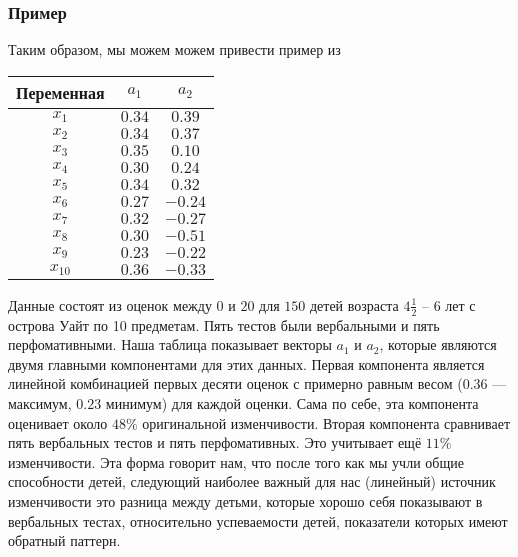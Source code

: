 \subsubsection*{Пример}
Таким образом, мы можем можем привести пример из \cite{pca}

\begin{center}
\begin{tabular}{ |c|c|c| } 
 \hline
 Переменная & $a_1$ & $a_2$ \\ 
 \hline \hline
 $x_1$ & $0.34$ & $0.39$ \\ 
 \hline
 $x_2$ & $0.34$ & $0.37$ \\ 
 \hline
 $x_3$ & $0.35$ & $0.10$ \\ 
 \hline
 $x_4$ & $0.30$ & $0.24$ \\ 
 \hline
 $x_5$ & $0.34$ & $0.32$ \\ 
 \hline
 $x_6$ & $0.27$ & $-0.24$ \\ 
 \hline
 $x_7$ & $0.32$ & $-0.27$ \\ 
 \hline
 $x_8$ & $0.30$ & $-0.51$ \\ 
 \hline
 $x_9$ & $0.23$ & $-0.22$ \\ 
 \hline
 $x_10$ & $0.36$ & $-0.33$ \\ 
 \hline
\end{tabular}
\end{center}

Данные состоят из оценок между $0$ и $20$ для $150$ детей возраста $4 \frac{1}{2}$ -- $6$ лет с острова Уайт по 10 предметам. 
Пять тестов были вербальными и пять перфомативными.
Наша таблица показывает векторы $a_1$ и $a_2$, которые являются двумя главными компонентами для этих данных. 
Первая компонента является линейной комбинацией первых десяти оценок с примерно равным весом ($0.36$ --- максимум, $0.23$ минимум) для каждой оценки. 
Сама по себе, эта компонента оценивает около $48\%$ оригинальной изменчивости. 
Вторая компонента сравнивает пять вербальных тестов и пять перфомативных. 
Это учитывает ещё $11\%$ изменчивости. 
Эта форма говорит нам, что после того как мы учли общие способности детей, следующий наиболее важный для нас (линейный) источник изменчивости это разница между детьми, которые хорошо себя показывают в вербальных тестах, относительно успеваемости детей, показатели которых имеют обратный паттерн.
